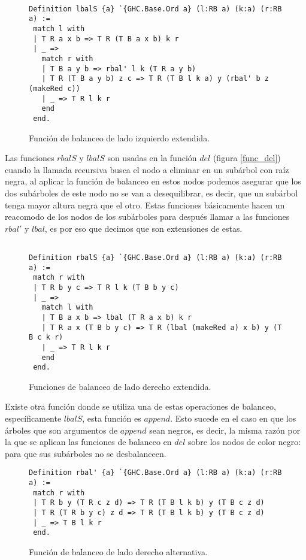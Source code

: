 \begin{figure}[!ht]
\centering
\captionsetup{justification=centering}
\begin{verbatim}

Definition lbalS {a} `{GHC.Base.Ord a} (l:RB a) (k:a) (r:RB a) :=
 match l with
 | T R a x b => T R (T B a x b) k r
 | _ =>
   match r with
   | T B a y b => rbal' l k (T R a y b)
   | T R (T B a y b) z c => T R (T B l k a) y (rbal' b z (makeRed c))
   | _ => T R l k r
   end
 end.

\end{verbatim}
\caption{Funci\'on de balanceo de lado izquierdo extendida.}
\label{lbalS}
\end{figure}

Las funciones $rbalS$ y $lbalS$ son usadas en la funci\'on $del$ (figura \ref{func_del}) cuando la llamada recursiva busca el  nodo a eliminar en un sub\'arbol con ra\'iz negra, al aplicar la funci\'on de balanceo en estos nodos podemos
asegurar que los dos subárboles de este nodo no se van a desequilibrar, es decir, que un subárbol
tenga mayor altura negra que el otro. Estas funciones
b\'asicamente hacen un reacomodo de los nodos de los sub\'arboles para despu\'es llamar a las 
funciones $rbal'$ y $lbal$, es por eso que decimos que son extensiones de estas.


\begin{figure}[!ht]
\centering
\captionsetup{justification=centering}
\begin{verbatim}

Definition rbalS {a} `{GHC.Base.Ord a} (l:RB a) (k:a) (r:RB a) :=
 match r with
 | T R b y c => T R l k (T B b y c)
 | _ =>
   match l with
   | T B a x b => lbal (T R a x b) k r
   | T R a x (T B b y c) => T R (lbal (makeRed a) x b) y (T B c k r)
   | _ => T R l k r
   end
 end.

\end{verbatim}
\caption{Funciones de balanceo de lado derecho extendida.}
\label{rbalS}
\end{figure}

Existe otra función donde se utiliza una de estas operaciones de balanceo, específicamente $lbalS$,
esta funci\'on es $append$. Esto sucede en el caso en que los \'arboles que son argumentos de $append$
sean negros, es decir, la misma razón por la que se aplican las funciones de balanceo en $del$
sobre los nodos de color negro: para que sus subárboles no se desbalanceen.

\begin{figure}[!ht]
\centering
\captionsetup{justification=centering}
\begin{verbatim}
Definition rbal' {a} `{GHC.Base.Ord a} (l:RB a) (k:a) (r:RB a) :=
 match r with
 | T R b y (T R c z d) => T R (T B l k b) y (T B c z d)
 | T R (T R b y c) z d => T R (T B l k b) y (T B c z d)
 | _ => T B l k r
 end.

\end{verbatim}
\caption{Funci\'on de balanceo de lado derecho alternativa.}
\label{rbal_2}
\end{figure}

